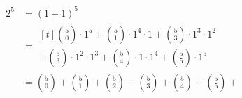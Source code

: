 \documentclass{article}
\begin{document}
    \begin{align*}
        2^5 &= (1+1)^5\\
        &= \begin{multlined}[t]
            \binom{5}{0}\cdot 1^5 + \binom51\cdot 1^4 \cdot 1 + \binom53\cdot 1^3 \cdot 1^2 \\
            + \binom53\cdot 1^2 \cdot 1^3 + \binom54\cdot1 \cdot 1^4 + \binom55\cdot 1^5
        \end{multlined} \\
        &= \binom50 + \binom51 + \binom52 + \binom53 + \binom54 + \binom55 + 
    \end{align*}
\end{document}

